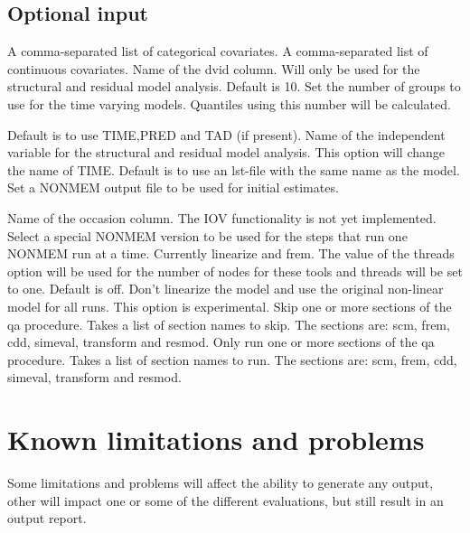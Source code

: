 \subsection{Optional input}

\begin{optionlist}
A comma-separated list of categorical covariates.
\nextopt
{}
A comma-separated list of continuous covariates.
\nextopt
{}
Name of the dvid column.
Will only be used for the structural and residual model analysis.
\nextopt
{}
Default is 10. Set the number of groups to use for the time varying models.
Quantiles using this number will be calculated.

\nextopt
{}
Default is to use TIME,PRED and TAD (if present). Name of the independent variable for the structural and residual model analysis.
This option will change the name of TIME.
\nextopt
{}
Default is to use an lst-file with the same name as the model. Set a NONMEM output file to be used for initial estimates.

\nextopt
{}
Name of the occasion column. The IOV functionality is not yet implemented.
\nextopt
{}
	Select a special NONMEM version to be used for the steps
    that run one NONMEM run at a time. Currently linearize
    and frem. The value of the threads option will be used for
    the number of nodes for these tools and threads will be set
    to one.
\nextopt
{}
Default is off. Don't linearize the model and use the original non-linear model for all runs.
This option is experimental.
\nextopt
{}
Skip one or more sections of the qa procedure. Takes a list of section names to skip. The sections are: scm, frem, cdd, simeval,
transform and resmod.
\nextopt
{}
Only run one or more sections of the qa procedure. Takes a list of section names to run. The sections are: scm, frem, cdd, simeval, transform and resmod.
\nextopt
\end{optionlist}

\section{Known limitations and problems}

Some limitations and problems will affect the ability to generate any output, other will impact one or some of the different evaluations, but still result in an output report. 

